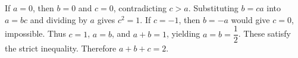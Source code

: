 If $a=0$, then $b=0$ and $c=0$, contradicting $c>a$. Substituting $b=ca$ into $a=bc$ and dividing by $a$ gives $c^2=1$. If $c=-1$, then $b=-a$ would give $c=0$, impossible. Thus $c=1$, $a=b$, and $a+b=1$, yielding $a=b=\dfrac{1}{2}$. These satisfy the strict inequality. Therefore $a+b+c=\boxed2$.
